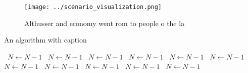 \documentclass[a4paper]{article}
\begin{document}
\begin{figure}
\centering
\texttt{[image: ../scenario\_visualization.png]}
\caption{Althusser and economy went rom to people o the la
}
\end{figure}
 
\begin{algorithm}
\caption{An algorithm with caption}
\begin{algorithmic}
\    \State $N \gets N - 1$
\    \State $N \gets N - 1$
\    \State $N \gets N - 1$
\    \State $N \gets N - 1$
\    \State $N \gets N - 1$
\    \State $N \gets N - 1$
\    \State $N \gets N - 1$
\    \State $N \gets N - 1$
\    \State $N \gets N - 1$
\    \State $N \gets N - 1$
\    \State $N \gets N - 1$
\EndWhile
\end{algorithmic}
\end{algorithm}
\end{document}
